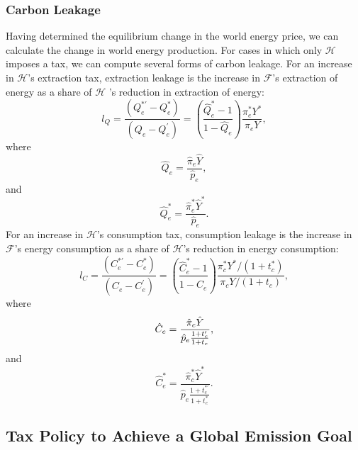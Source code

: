 \documentclass[notitlepage,12pt]{article}
\begin{document}
\subsubsection{Carbon Leakage}

Having determined the equilibrium change in the world energy price, we can
calculate the change in world energy production. For cases in which only $%
\mathcal{H}$ imposes a tax, we can compute several forms of carbon leakage.
For an increase in $\mathcal{H}$'s extraction tax, extraction leakage is the
increase in $\mathcal{F}$'s extraction of energy as a share of $\mathcal{H}$%
's reduction in extraction of energy:%
\begin{equation*}
l_{Q}=\frac{\left( Q_{e}^{\ast \prime }-Q_{e}^{\ast }\right) }{\left(
Q_{e}-Q_{e}^{\prime }\right) }=\left( \frac{\hat{Q}_{e}^{\ast }-1}{1-\hat{Q}%
_{e}}\right) \frac{\pi _{e}^{\ast }Y^{\ast }}{\pi _{e}Y},
\end{equation*}%
where%
\begin{equation*}
\hat{Q}_{e}=\frac{\hat{\pi}_{e}\hat{Y}}{\hat{p}_{e}},
\end{equation*}%
and 
\begin{equation*}
\hat{Q}_{e}^{\ast }=\frac{\hat{\pi}_{e}^{\ast }\hat{Y}^{\ast }}{\hat{p}_{e}}.
\end{equation*}%
For an increase in $\mathcal{H}$'s consumption tax, consumption leakage is
the increase in $\mathcal{F}$'s energy consumption as a share of $\mathcal{H}
$'s reduction in energy consumption:%
\begin{equation*}
l_{C}=\frac{\left( C_{e}^{\ast \prime }-C_{e}^{\ast }\right) }{\left(
C_{e}-C_{e}^{\prime }\right) }=\left( \frac{\hat{C}_{e}^{\ast }-1}{1-\hat{C}%
_{e}}\right) \frac{\pi _{c}^{\ast }Y^{\ast }/(1+t_{c}^{\ast })}{\pi
_{c}Y/(1+t_{c})},
\end{equation*}%
where%
\begin{equation*}
\hat{C}_{e}=\frac{\hat{\pi}_{c}\hat{Y}}{\hat{p}_{e}\frac{1+t_{c}^{\prime }}{%
1+t_{c}}},
\end{equation*}%
and 
\begin{equation*}
\hat{C}_{e}^{\ast }=\frac{\hat{\pi}_{c}^{\ast }\hat{Y}^{\ast }}{\hat{p}_{e}%
\frac{1+t_{c}^{\ast \prime }}{1+t_{c}^{\ast }}}.
\end{equation*}

\subsection{Tax Policy to Achieve a Global Emission Goal}
\end{document}
